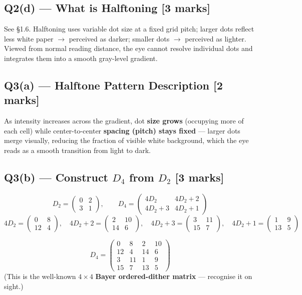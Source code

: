 \documentclass[12pt, a4paper]{article}
\newenvironment{solutionbox}{\begin{mdframed}[style=solutionframe]}{\end{mdframed}}
\newenvironment{answerbox}{\begin{mdframed}[style=answerframe]}{\end{mdframed}}
\begin{document}
\subsection*{Q2(d) --- What is Halftoning [3 marks]}
See \S1.6. Halftoning uses variable dot size at a fixed grid pitch; larger dots reflect less white paper $\to$ perceived as darker; smaller dots $\to$ perceived as lighter. Viewed from normal reading distance, the eye cannot resolve individual dots and integrates them into a smooth gray-level gradient.

\subsection*{Q3(a) --- Halftone Pattern Description [2 marks]}
As intensity increases across the gradient, dot \textbf{size grows} (occupying more of each cell) while center-to-center \textbf{spacing (pitch) stays fixed} — larger dots merge visually, reducing the fraction of visible white background, which the eye reads as a smooth transition from light to dark.

\subsection*{Q3(b) --- Construct $D_4$ from $D_2$ [3 marks]}
\begin{solutionbox}
$$D_2 = \begin{pmatrix}0&2\\3&1\end{pmatrix}, \qquad D_4 = \begin{pmatrix}4D_2 & 4D_2+2\\ 4D_2+3 & 4D_2+1\end{pmatrix}$$
$$4D_2=\begin{pmatrix}0&8\\12&4\end{pmatrix},\quad 4D_2{+}2=\begin{pmatrix}2&10\\14&6\end{pmatrix},\quad 4D_2{+}3=\begin{pmatrix}3&11\\15&7\end{pmatrix},\quad 4D_2{+}1=\begin{pmatrix}1&9\\13&5\end{pmatrix}$$
\end{solutionbox}
\begin{answerbox}
$$D_4 = \begin{pmatrix} 0 & 8 & 2 & 10\\ 12 & 4 & 14 & 6\\ 3 & 11 & 1 & 9\\ 15 & 7 & 13 & 5 \end{pmatrix}$$
(This is the well-known $4\times4$ \textbf{Bayer ordered-dither matrix} — recognise it on sight.)
\end{answerbox}
\end{document}
